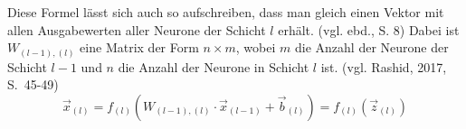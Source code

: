 \documentclass[a4paper,12pt,ngerman,oneside]{scrreprt}	%
\begin{document}
		 Diese Formel lässt sich auch so aufschreiben, dass man gleich einen Vektor mit allen Ausgabewerten aller Neurone der Schicht $l$ erhält. (vgl. ebd., S. 8)	Dabei ist $W_{(l-1),(l)}$ eine Matrix der Form $n\times m$, wobei $m$ die Anzahl der Neurone der Schicht $l-1$ und $n$ die Anzahl der Neurone in Schicht $l$ ist. (vgl. Rashid, 2017, \mbox{S. 45-49})
		 	\begin{equation}\label{FormelNeuronVektor}
			 	\vec{x}_{(l)} = f_{(l)}(W_{(l-1),(l)} \cdot \vec{x}_{(l-1)} + \vec{b}_{(l)})  = f_{(l)}(\vec{z}_{(l)})
		 	\end{equation}


			
\end{document}
